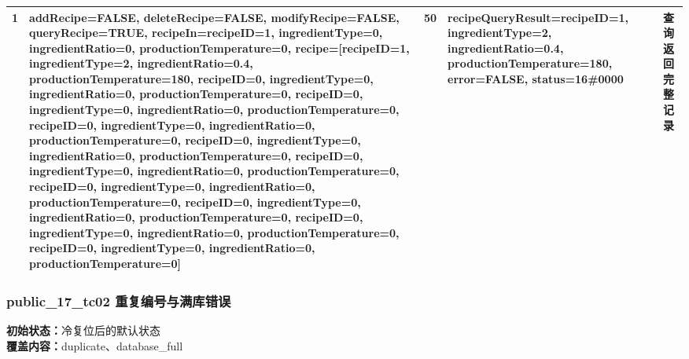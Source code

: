 \begin{longtable}{L{1.0cm}L{4.7cm}L{1.4cm}L{4.0cm}L{2.1cm}}
1 & addRecipe=FALSE, deleteRecipe=FALSE, modifyRecipe=FALSE, queryRecipe=TRUE, recipeIn=recipeID=1, ingredientType=0, ingredientRatio=0, productionTemperature=0, recipe=[recipeID=1, ingredientType=2, ingredientRatio=0.4, productionTemperature=180, recipeID=0, ingredientType=0, ingredientRatio=0, productionTemperature=0, recipeID=0, ingredientType=0, ingredientRatio=0, productionTemperature=0, recipeID=0, ingredientType=0, ingredientRatio=0, productionTemperature=0, recipeID=0, ingredientType=0, ingredientRatio=0, productionTemperature=0, recipeID=0, ingredientType=0, ingredientRatio=0, productionTemperature=0, recipeID=0, ingredientType=0, ingredientRatio=0, productionTemperature=0, recipeID=0, ingredientType=0, ingredientRatio=0, productionTemperature=0, recipeID=0, ingredientType=0, ingredientRatio=0, productionTemperature=0, recipeID=0, ingredientType=0, ingredientRatio=0, productionTemperature=0] & 50 & recipeQueryResult=recipeID=1, ingredientType=2, ingredientRatio=0.4, productionTemperature=180, error=FALSE, status=16\#0000 & 查询返回完整记录\\

\bottomrule

\end{longtable}

\subsubsection{{\ttfamily public\_17\_tc02} 重复编号与满库错误}

\noindent\textbf{初始状态：}冷复位后的默认状态\\

\textbf{覆盖内容：}duplicate、database\_full

